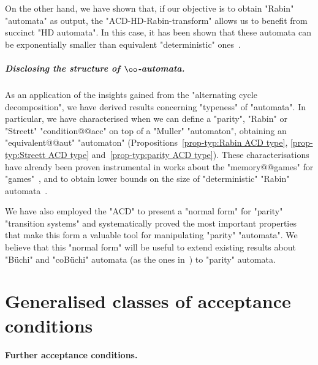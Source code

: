 \documentclass[10pt,a4paper]{amsart}
\begin{document}
On the other hand, we have shown that, if our objective is to obtain "Rabin" "automata" as output, the "ACD-HD-Rabin-transform" allows us to benefit from succinct "HD automata". In this case, it has been shown that these automata can be exponentially smaller than equivalent "deterministic" ones~\cite[Theorem~21]{CCL22SizeGFG}.


\subparagraph*{Disclosing the structure of $\oo$-automata.} As an application of the insights gained from the "alternating cycle decomposition", we have derived results concerning "typeness" of "automata". In particular, we have characterised when we can define a "parity", "Rabin" or "Streett" "condition@@acc" on top of a "Muller" "automaton", obtaining an "equivalent@@aut" "automaton" (Propositions~\ref{prop-typ:Rabin ACD type}, \ref{prop-typ:Streett ACD type} and~\ref{prop-typ:parity ACD type}). These characterisations have already been proven instrumental in works about the "memory@@games" for "games"~\cite{Casares2021Chromatic}, and to obtain lower bounds on the size of "deterministic" "Rabin" automata~\cite{CCL22SizeGFG}.

We have also employed the "ACD" to present a "normal form" for "parity" "transition systems" and systematically proved the most important properties that make this form a valuable tool for manipulating "parity" "automata". We believe that this "normal form" will be useful to extend existing results about "B\"uchi" and "coB\"uchi" automata (as the ones in~\cite{AK22MinimizingGFG,BKS17HowDeterministicGFG, BCRV22HalfPosBuchi}) to "parity" automata.
 	
    \printbibliography
	
	\newpage
	\appendix
	\section{Generalised classes of acceptance conditions}
	\label{sec:appendix-weak-conditions}
	\paragraph*{Further acceptance conditions.}
\end{document}
